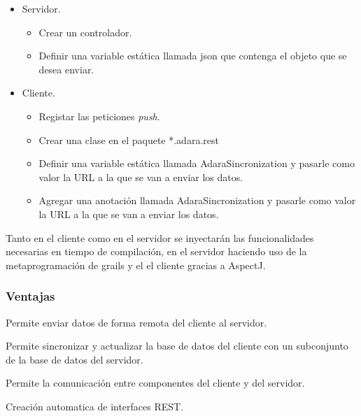 \documentclass[12pt,a4paper,spanish,openany]{book}
\begin{document}
\begin{itemize}
  \item Servidor.
    \begin{itemize}
        \item Crear un controlador.
        \item Definir una variable estática llamada json que contenga el objeto
        que se desea enviar.
    \end{itemize}
    \item Cliente.
    \begin{itemize}
        \item Registar las peticiones \emph{push}.
        \item Crear una clase en el paquete *.adara.rest
        \item Definir una variable estática llamada AdaraSincronization y
        pasarle como valor la URL a la que se van a enviar los datos.
        \item Agregar una anotación llamada AdaraSincronization y
        pasarle como valor la URL a la que se van a enviar los datos.
    \end{itemize}   
\end{itemize}


Tanto en el cliente como en el servidor se inyectarán las funcionalidades
necesarias en tiempo de compilación, en el servidor haciendo uso de la
metaprogramación de grails y el el cliente gracias a AspectJ.



\subsubsection{Ventajas}
Permite enviar datos de forma remota del cliente al servidor.

Permite sincronizar y actualizar la base de datos del cliente con un subconjunto
de la base de datos del servidor.

Permite la comunicación entre componentes del cliente y del servidor.

Creación automatica de interfaces REST.

\singlespacing


\end{document}
